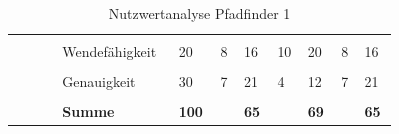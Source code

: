 \documentclass[main.tex]{subfiles} %
\begin{document}
\begin{landscape}
\begin{table}[H]
\begin{tabular}{|p{0.11\linewidth}|p{0.18\linewidth}|p{0.085\linewidth}|p{0.057\linewidth}|p{0.07\linewidth}|p{0.057\linewidth}|p{0.07\linewidth}|p{0.057\linewidth}|p{0.07\linewidth}|}
            \cline{2-9}
                                                      &                                     &                                            &                                           &                                            &            &             &            &             \\[-9pt]
                                                      & Wendefähigkeit                      & 20                                         & 8                                         & 16                                         & 10         & 20          & 8          & 16          \\[1pt]
            \cline{2-9}
                                                      &                                     &                                            &                                           &                                            &            &             &            &             \\[-9pt]
                                                      & Genauigkeit                         & 30                                         & 7                                         & 21                                         & 4          & 12          & 7          & 21          \\[1pt]
            \cline{2-9}
                                                      &                                     &                                            &                                           &                                            &            &             &            &             \\[-9pt]
                                                      & \textbf{Summe}                      & \textbf{100}                               &                                           & \textbf{65}                                &            & \textbf{69} &            & \textbf{65} \\[1pt]
            \hline

        \end{tabular}
        \caption{Nutzwertanalyse Pfadfinder 1}
    \end{table}


\end{landscape}
\end{document}
